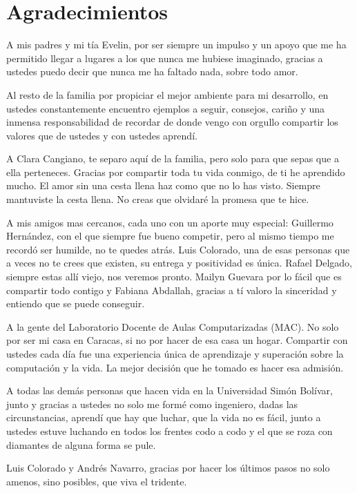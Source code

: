 \chapter*{Agradecimientos}

A mis padres y mi tía Evelin, por ser siempre un impulso y un apoyo que me ha permitido llegar a lugares a los que nunca me hubiese imaginado, gracias a ustedes puedo decir que nunca me ha faltado nada, sobre todo amor.

Al resto de la familia por propiciar el mejor ambiente para mi desarrollo, en ustedes constantemente encuentro ejemplos a seguir, consejos, cariño y una inmensa responsabilidad de recordar de donde vengo con orgullo compartir los valores que de ustedes y con ustedes aprendí. 

A Clara Cangiano, te separo aquí de la familia, pero solo para que sepas que a ella perteneces. Gracias por compartir toda tu vida conmigo, de ti he aprendido mucho. El amor sin una cesta llena haz como que no lo has visto. Siempre mantuviste la cesta llena. No creas que olvidaré la promesa que te hice.

A mis amigos mas cercanos, cada uno con un aporte muy especial: Guillermo Hernández, con el que siempre fue bueno competir, pero al mismo tiempo me recordó ser humilde, no te quedes atrás. Luis Colorado, una de esas personas que a veces no te crees que existen, su entrega y positividad es única. Rafael Delgado, siempre estas allí viejo, nos veremos pronto. Mailyn Guevara por lo fácil que es compartir todo contigo y Fabiana Abdallah, gracias a tí valoro la sinceridad y entiendo que se puede conseguir.

A la gente del Laboratorio Docente de Aulas Computarizadas (MAC). No solo por ser mi casa en Caracas, si no por hacer de esa casa un hogar. Compartir con ustedes cada día fue una experiencia única de aprendizaje y superación sobre la computación y la vida. La mejor decisión que he tomado es hacer esa admisión.

A todas las demás personas que hacen vida en la Universidad Simón Bolívar, junto y gracias a ustedes no solo me formé como ingeniero, dadas las circunstancias, aprendí que hay que luchar, que la vida no es fácil, junto a ustedes estuve luchando en todos los frentes codo a codo y el que se roza con diamantes de alguna forma se pule.

Luis Colorado y Andrés Navarro, gracias por hacer los últimos pasos no solo amenos, sino posibles, que viva el tridente.